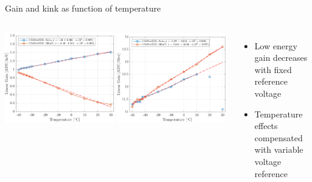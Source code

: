 \documentclass[aspectratio=169,xcolor=dvipsnames,handout]{beamer} %
\newcommand{\xmark}{\ding{55}}
\newcommand{\greencheck}{{\color{ForestGreen}\checkmark}}
\newcommand{\redcross}{{\color{Red}\xmark}}
\begin{document}
\begin{frame}{Gain and kink as function of temperature}
\begin{columns}
            \vspace{-0.3cm}
            \begin{center}
                \includegraphics[width=0.49\textwidth]{images/temperature_effects/low_energy_gain_auto_530mV.pdf}
                \includegraphics[width=0.49\textwidth]{images/temperature_effects/high_energy_gain_auto_530mV.pdf}
            \end{center}

            \vskip-0.3cm
            \addtolength{\leftmargini}{\labelsep}
            \begin{itemize}
                \item Low energy gain decreases with fixed reference voltage \redcross
                \item Temperature effects compensated with variable voltage reference \greencheck
            \end{itemize}
            \vskip0.1cm


\end{columns}
\end{frame}
\end{document}
